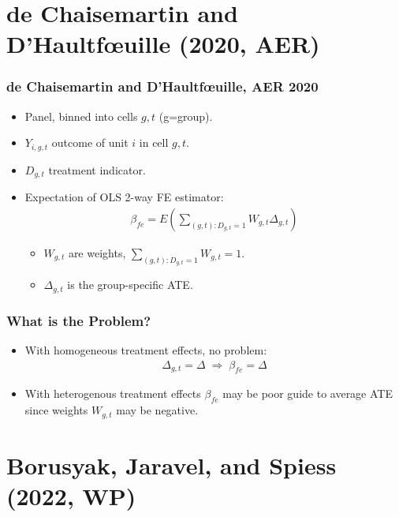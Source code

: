 \documentclass[english,xcolor=svgnames]{beamer}
\begin{document}
\section{de Chaisemartin and D'Haultf{\oe}uille (2020, AER)}

\begin{frame}
\frametitle[alignment=center]{de Chaisemartin and D'Haultf{\oe}uille, AER 2020}
\begin{itemize}
	\item Panel, binned into cells $g,t$ (g=group).
	\item $Y_{i,g,t}$ outcome of unit $i$ in cell $g,t$.
	\item $D_{g,t}$ treatment indicator.
	\item Expectation of OLS 2-way FE estimator:
	\begin{align*}
		\beta_{fe} = E \left(\sum_{(g,t):D_{g,t}=1} W_{g,t}\Delta_{g,t}\right)
	\end{align*}
	\begin{itemize}
		\item $W_{g,t}$ are weights, $\sum_{(g,t):D_{g,t}=1} W_{g,t}=1$.
		\item $\Delta_{g,t}$ is the group-specific ATE.
	\end{itemize}
\end{itemize}
\end{frame}

\begin{frame}
\frametitle[alignment=center]{What is the Problem?}
\begin{itemize}
	\item With homogeneous treatment effects, no problem:
	\begin{align*}
		 \Delta_{g,t}=\Delta \;\Rightarrow\; \beta_{fe} = \Delta
	\end{align*}
	\item With heterogenous treatment effects $\beta_{fe}$ may be poor guide to average ATE since weights $W_{g,t}$ may be negative.
\end{itemize}
\end{frame}

\section{Borusyak, Jaravel, and Spiess (2022, WP)}
\end{document}
